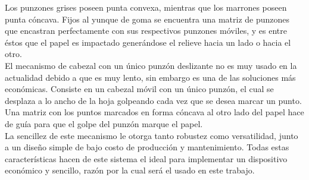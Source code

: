 Los punzones grises poseen punta convexa, mientras que los marrones poseen
punta c\'oncava. Fijos al yunque de goma se encuentra una matriz de punzones
que encastran perfectamente con sus respectivos punzones m\'oviles, y es entre
\'estos que el papel es impactado gener\'andose el relieve hacia un lado o
hacia el otro. \\

El mecanismo de cabezal con un \'unico punz\'on deslizante no es muy usado
en la actualidad debido a que es muy lento, sin embargo es una de las
soluciones m\'as econ\'omicas. Consiste en un cabezal m\'ovil con un \'unico
punz\'on, el cual se desplaza a lo ancho de la hoja golpeando cada vez que se
desea marcar un punto. Una matriz con los puntos marcados en forma c\'oncava al
otro lado del papel hace de gu\'ia para que el golpe del punz\'on marque el
papel.\\


%
%

La sencillez de este mecanismo le otorga tanto robustez como versatilidad,
junto a un dise\~no simple de bajo costo de producci\'on y mantenimiento. Todas
estas caracter\'isticas hacen de este sistema el ideal para implementar un
dispositivo econ\'omico y sencillo, raz\'on por la cual ser\'a el usado en
este trabajo.